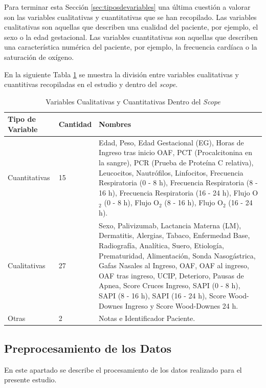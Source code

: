 Para terminar esta Sección \ref{sec:tiposdevariables} una última cuestión a valorar son las variables cualitativas y cuantitativas que se han recopilado. Las variables cualitativas son aquellas que describen una cualidad del paciente, por ejemplo, el sexo o la edad gestacional. Las variables cuantitativas son aquellas que describen una característica numérica del paciente, por ejemplo, la frecuencia cardíaca o la saturación de oxígeno.

En la siguiente Tabla \ref{tabla:cuali_cuanti} se muestra la división entre variables cualitativas y cuantitivas recopiladas en el estudio y dentro del \textit{scope}.

\begin{table}[H]
    \centering
        \begin{tabular}{| m{5cm} | m{1.75cm} | m{7cm} |}
            \hline Tipo de Variable & Cantidad & Nombres  \\ \hline
            Cuantitativas & 15 & Edad, Peso, Edad Gestacional (EG), Horas de Ingreso tras inicio OAF, PCT (Procalcitonina en la sangre), PCR (Prueba de Proteína C relativa), Leucocitos, Nautrófilos, Linfocitos, Frecuencia Respiratoria (0 - 8 h), Frecuencia Respiratoria (8 - 16 h),
            Frecuencia Respiratoria (16 - 24 h),
            Flujo O$_2$ (0 - 8 h),
            Flujo O$_2$ (8 - 16 h),
            Flujo O$_2$ (16 - 24 h). \\ \hline
            Cualitativas & 27 & Sexo, Palivizumab, Lactancia Materna (LM), Dermatitis, Alergias, Tabaco, Enfermedad Base, Radiografía, Analítica, Suero, Etiología, Prematuridad, Alimentación, Sonda Nasogástrica, Gafas Nasales al Ingreso, OAF, OAF al ingreso, OAF tras ingreso, UCIP, Deterioro, Pausas de Apnea, Score Cruces Ingreso, SAPI (0 - 8 h),
            SAPI (8 - 16 h), 
            SAPI (16 - 24 h), Score Wood-Downes Ingreso y Score Wood-Downes 24 h. \\ \hline
            Otras & 2 & Notas e Identificador Paciente. \\ \hline
        \end{tabular}
    \caption{Variables Cualitativas y Cuantitativas Dentro del \textit{Scope}}\label{tabla:cuali_cuanti}
\end{table}

\subsection{Preprocesamiento de los Datos}

En este apartado se describe el procesamiento de los datos realizado para el presente estudio.

